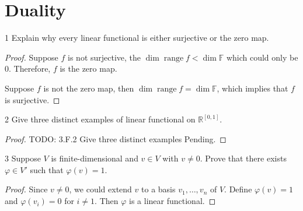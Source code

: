 \documentclass{article}
\newenvironment{problem}[1]{\begin{prob*}{#1}{}}{\end{prob*}}
\DeclareMathOperator{\Range}{range}
\begin{document}
\section{Duality}

\begin{problem}{1}
Explain why every linear functional is either surjective or the zero map.
\end{problem}
\begin{proof}
Suppose $f$ is not surjective, the $\operatorname{dim} \Range f < \operatorname{dim} \mathbb{F}$ which could only be 0. Therefore, $f$ is the zero map. \par
Suppose $f$ is not the zero map, then $\operatorname{dim} \Range f = \operatorname{dim} \mathbb{F}$, which implies that $f$ is surjective.
\end{proof}

\begin{problem}{2}
Give three distinct examples of linear functional on $\mathbb{R}^{[0,1]}$.
\end{problem}
\begin{proof}
TODO: 3.F.2 Give three distinct examples Pending.
\end{proof}

\newpage
\begin{problem}{3}
Suppose $V $ is finite-dimensional and $v \in V$ with $v \neq 0.$ Prove that there exists $\varphi \in V'$ such that $\varphi(v) = 1$.
\end{problem}
\begin{proof}
Since $v \neq 0$, we could extend $v$ to a basis $v_1, \ldots ,v_n$ of $V$. Define $\varphi(v) = 1$ and $\varphi(v_i) = 0$ for $i \neq 1$. Then $\varphi$ is a linear functional.
\end{proof}

\end{document}
